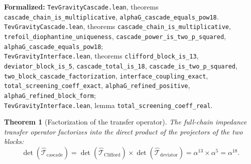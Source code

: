 \documentclass[11pt,a4paper]{article}
\newtheorem{theorem}{Theorem}
\theoremstyle{definition}
\theoremstyle{remark}
\begin{document}
\noindent\small\textbf{Formalized:} \texttt{TevGravityCascade.lean}, theorems \texttt{cascade_chain_is_multiplicative}, \texttt{alphaG_cascade_equals_pow18}.
\texttt{TevGravityCascade.lean}, theorems \texttt{cascade_chain_is_multiplicative}, \texttt{trefoil_diophantine_uniqueness}, \texttt{cascade_power_is_two_p_squared}, \texttt{alphaG_cascade_equals_pow18};\\ \texttt{TevGravityInterface.lean}, theorems \texttt{clifford_block_is_13}, \texttt{deviator_block_is_5}, \texttt{cascade_total_is_18}, \texttt{cascade_is_two_p_squared}, \texttt{two_block_cascade_factorization}, \texttt{interface_coupling_exact}, \texttt{total_screening_coeff_exact}, \texttt{alphaG_refined_positive}, \texttt{alphaG_refined_block_form};\\ \texttt{TevGravityInterface.lean}, lemma \texttt{total_screening_coeff_real}.

\begin{theorem}[Factorization of the transfer operator]
\label{thm:transfer_operator_factorization}
The full-chain impedance transfer operator factorizes into the direct product of the projectors of the two blocks:
\begin{equation}
	\det(\hat{\mathcal{T}}_{\mathrm{cascade}}) = \det(\hat{\mathcal{T}}_{\mathrm{Clifford}}) \times \det(\hat{\mathcal{T}}_{\mathrm{deviator}}) = \alpha^{13} \times \alpha^5 = \alpha^{18}.
	\label{eq:two_block_factorization_exact}
\end{equation}
\end{theorem}
\end{document}
